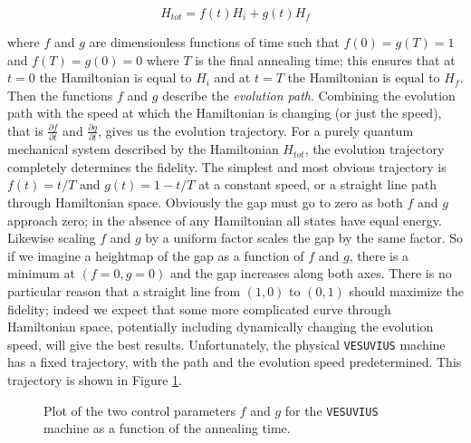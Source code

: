 \begin{displaymath}
	H_{tot} = f(t)H_i + g(t)H_f
\end{displaymath}

where $f$ and $g$ are dimensionless functions of time such that $f(0) = g(T) = 1$ and $f(T) = g(0) = 0$ where $T$ is the final annealing time; this ensures that at $t = 0$ the Hamiltonian is equal to $H_i$ and at $t = T$ the Hamiltonian is equal to $H_f$.  Then the functions $f$ and $g$ describe the \emph{evolution path}.  Combining the evolution path with the speed at which the Hamiltonian is changing (or just the speed), that is $\frac{\partial f}{\partial t}$ and $\frac{\partial g}{\partial t}$, gives us the evolution trajectory.  For a purely quantum mechanical system described by the Hamiltonian $H_{tot}$, the evolution trajectory completely determines the fidelity.
The simplest and most obvious trajectory is $f(t) = t/T$ and $g(t) = 1 - t/T$ at a constant speed, or a straight line path through Hamiltonian space.
Obviously the gap must go to zero as both $f$ and $g$ approach zero; in the absence of any Hamiltonian all states have equal energy.  Likewise scaling $f$ and $g$ by a uniform factor scales the gap by the same factor.  So if we imagine a heightmap of the gap as a function of $f$ and $g$, there is a minimum at $(f=0,g=0)$ and the gap increases along both axes.  
There is no particular reason that a straight line from $(1,0)$ to $(0,1)$ should maximize the fidelity; indeed we expect that some more complicated curve through Hamiltonian space, potentially including dynamically changing the evolution speed, will give the best results.
Unfortunately, the physical \texttt{VESUVIUS} machine has a fixed trajectory, with the path and the evolution speed predetermined.  This trajectory is shown in Figure \ref{fig:trajectory}.

\begin{figure}
	\caption[\texttt{VESUVIUS Evolution Trajectory}]{Plot of the two control parameters $f$ and $g$ for the \texttt{VESUVIUS} machine as a function of the annealing time.}
	\label{fig:trajectory}
\end{figure}
